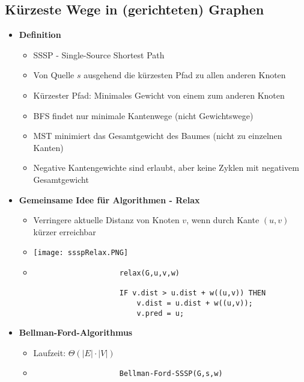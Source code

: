 \pagebreak

\subsection{Kürzeste Wege in (gerichteten) Graphen}
    \begin{itemize}
        \item \textbf{Definition}
            \begin{itemize}
                \item SSSP - Single-Source Shortest Path
                \item Von Quelle $s$ ausgehend die kürzesten Pfad zu allen anderen Knoten
                \item Kürzester Pfad: Minimales Gewicht von einem zum anderen Knoten
                \item BFS findet nur minimale Kantenwege (nicht Gewichtswege)
                \item MST minimiert das Gesamtgewicht des Baumes (nicht zu einzelnen Kanten)
                \item Negative Kantengewichte sind erlaubt, aber keine Zyklen mit negativem Gesamtgewicht
            \end{itemize}
        
        \item \textbf{Gemeinsame Idee für Algorithmen - Relax}
            \begin{itemize}
                \item Verringere aktuelle Distanz von Knoten $v$, wenn durch Kante $(u,v)$ kürzer erreichbar
                \item[] \texttt{[image: ssspRelax.PNG]}
                \item[]
                    \begin{verbatim}
                    relax(G,u,v,w)

                    IF v.dist > u.dist + w((u,v)) THEN
                        v.dist = u.dist + w((u,v));
                        v.pred = u;
                    \end{verbatim}
            \end{itemize}

        \item \textbf{Bellman-Ford-Algorithmus}
            \begin{itemize}
                \item Laufzeit: $\Theta(|E| \cdot |V|)$
                \item[]
                    \begin{verbatim}
                    Bellman-Ford-SSSP(G,s,w)


\end{verbatim}
\end{itemize}
\end{itemize}
